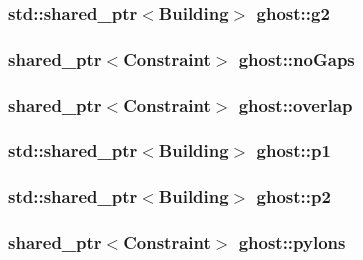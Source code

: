 \hypertarget{namespaceghost_a06d6bb1ff9795198ea63e209711cfc9e}{
\subsubsection[{g2}]{\setlength{\rightskip}{0pt plus 5cm}std\-::shared\-\_\-ptr$<${\bf Building}$>$ ghost\-::g2}}\label{namespaceghost_a06d6bb1ff9795198ea63e209711cfc9e}
\hypertarget{namespaceghost_a4b6df9d0b61991e356eb28353a73be30}{
\subsubsection[{no\-Gaps}]{\setlength{\rightskip}{0pt plus 5cm}shared\-\_\-ptr$<${\bf Constraint}$>$ ghost\-::no\-Gaps}}\label{namespaceghost_a4b6df9d0b61991e356eb28353a73be30}
\hypertarget{namespaceghost_a7a91cd37137a7eae220126fcbb8ff96b}{
\subsubsection[{overlap}]{\setlength{\rightskip}{0pt plus 5cm}shared\-\_\-ptr$<${\bf Constraint}$>$ ghost\-::overlap}}\label{namespaceghost_a7a91cd37137a7eae220126fcbb8ff96b}
\hypertarget{namespaceghost_ad597936cfadde60ce8c6ed70f14c242c}{
\subsubsection[{p1}]{\setlength{\rightskip}{0pt plus 5cm}std\-::shared\-\_\-ptr$<${\bf Building}$>$ ghost\-::p1}}\label{namespaceghost_ad597936cfadde60ce8c6ed70f14c242c}
\hypertarget{namespaceghost_a47f813abed554f342cbabdd87c34a89e}{
\subsubsection[{p2}]{\setlength{\rightskip}{0pt plus 5cm}std\-::shared\-\_\-ptr$<${\bf Building}$>$ ghost\-::p2}}\label{namespaceghost_a47f813abed554f342cbabdd87c34a89e}
\hypertarget{namespaceghost_a381584b094da85f582a9b24eedf21411}{
\subsubsection[{pylons}]{\setlength{\rightskip}{0pt plus 5cm}shared\-\_\-ptr$<${\bf Constraint}$>$ ghost\-::pylons}}\label{namespaceghost_a381584b094da85f582a9b24eedf21411}
